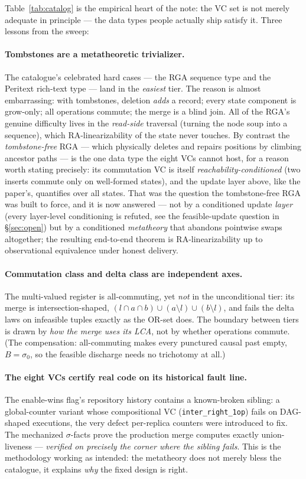 \documentclass[11pt]{article}
\newcommand{\Sinit}{\sigma_0}
\newcommand{\lean}[1]{\texttt{#1}}
\begin{document}
Table~\ref{tab:catalog} is the empirical heart of the note: the VC set is
not merely adequate in principle --- the data types people actually ship
satisfy it. Three lessons from the sweep:

\paragraph{Tombstones are a metatheoretic trivializer.} The catalogue's
celebrated hard cases --- the RGA sequence type and the Peritext
rich-text type --- land in the \emph{easiest} tier. The reason is almost
embarrassing: with tombstones, deletion \emph{adds} a record; every state
component is grow-only; all operations commute; the merge is a blind
join. All of the RGA's genuine difficulty lives in the \emph{read-side}
traversal (turning the node soup into a sequence), which
RA-linearizability of the state never touches. By contrast the
\emph{tombstone-free} RGA --- which physically deletes and repairs
positions by climbing ancestor paths --- is the one data type the eight
VCs cannot host, for a reason worth stating precisely: its commutation VC
is itself \emph{reachability-conditioned} (two inserts commute only on
well-formed states), and the update layer above, like the paper's,
quantifies over all states. That was the question the tombstone-free RGA
was built to force, and it is now answered --- not by a conditioned
update \emph{layer} (every layer-level conditioning is refuted, see the
feasible-update question in \S\ref{sec:open}) but by a conditioned
\emph{metatheory} that abandons pointwise swaps altogether; the resulting
end-to-end theorem is RA-linearizability up to observational equivalence
under honest delivery.

\paragraph{Commutation class and delta class are independent axes.} The
multi-valued register is all-commuting, yet \emph{not} in the
unconditional tier: its merge is intersection-shaped,
$(l \cap a \cap b) \cup (a \setminus l) \cup (b \setminus l)$, and fails
the delta laws on infeasible tuples exactly as the OR-set does. The
boundary between tiers is drawn by \emph{how the merge uses its LCA}, not
by whether operations commute. (The compensation: all-commuting makes
every punctured causal past empty, $B = \Sinit$, so the feasible
discharge needs no trichotomy at all.)

\paragraph{The eight VCs certify real code on its historical fault
line.} The enable-wins flag's repository history contains a
known-broken sibling: a global-counter variant whose compositional VC
(\lean{inter\_right\_1op}) fails on DAG-shaped executions, the very defect
per-replica counters were introduced to fix. The mechanized $\sigma$-facts
prove the production merge computes exactly union-liveness ---
\emph{verified on precisely the corner where the sibling fails}. This is
the methodology working as intended: the metatheory does not merely bless
the catalogue, it explains \emph{why} the fixed design is right.
\end{document}

